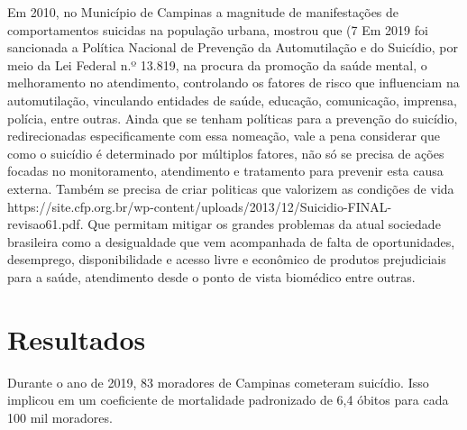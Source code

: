 Em 2010, no Município de Campinas a magnitude de manifestações de comportamentos suicidas na população urbana, mostrou que (7%
Em 2019 foi sancionada a Política Nacional de Prevenção da Automutilação e do Suicídio, por meio da Lei Federal n.º 13.819,  na procura da promoção da saúde mental, o melhoramento no atendimento, controlando os fatores de risco que influenciam na automutilação, vinculando entidades de saúde, educação, comunicação, imprensa, polícia, entre outras. Ainda que se tenham políticas para a prevenção do suicídio, redirecionadas especificamente com essa nomeação, vale a pena considerar que como o suicídio é determinado por múltiplos fatores, não só se precisa de ações focadas no monitoramento, atendimento e tratamento para prevenir esta causa externa. Também se precisa de criar politicas que valorizem as condições de vida https://site.cfp.org.br/wp-content/uploads/2013/12/Suicidio-FINAL-revisao61.pdf. Que permitam mitigar os grandes problemas da atual sociedade brasileira como a desigualdade que vem acompanhada de falta de oportunidades, desemprego, disponibilidade e acesso livre e econômico de produtos prejudiciais para a saúde, atendimento desde o ponto de vista biomédico entre outras.

\section{Resultados}

Durante o ano de 2019, 83 moradores de Campinas cometeram suicídio. Isso implicou em um coeficiente de mortalidade padronizado de 6,4 óbitos para cada 100 mil moradores.

